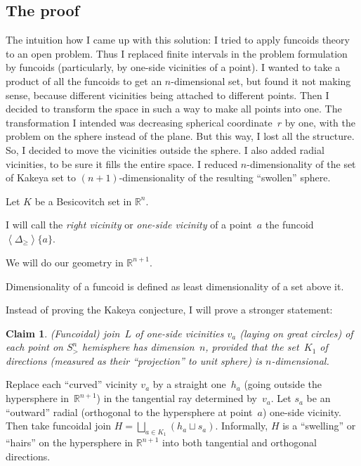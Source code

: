 \documentclass[oneside,draft]{amsart}
\newcommand{\supfun}[1]{\left\langle#1\right\rangle}
\newtheorem{claim}{Claim}
\begin{document}
\subsection{The proof}

The intuition how I came up with this solution: I tried to apply funcoids theory to an open problem. Thus I replaced finite intervals in the problem formulation by funcoids (particularly, by one-si\-de vicinities of a point). I wanted to take a product of all the funcoids to get an $n$-di\-men\-si\-on\-al set, but found it not making sense, because different vicinities being attached to different points. Then I decided to transform the space in such a way to make all points into one. The transformation I intended was decreasing spherical coordinate~$r$ by one, with the problem on the sphere instead of the plane. But this way, I lost all the structure. So, I decided to move the vicinities outside the sphere. I also added radial vicinities, to be sure it fills the entire space. I reduced $n$-di\-men\-sio\-na\-li\-ty of the set of Kakeya set to $(n+1)$-di\-men\-sio\-na\-li\-ty of the resulting ``swollen'' sphere.

Let $K$ be a Besicovitch set in $\mathbb{R}^n$.

I will call the \emph{right vicinity} or \emph{one-si\-de vicinity} of a point~$a$ the funcoid~$\supfun{\Delta_{\geq}}\{a\}$.

We will do our geometry in $\mathbb{R}^{n+1}$.

Dimensionality of a funcoid is defined as least dimensionality of a set above it.

Instead of proving the Kakeya conjecture, I will prove a stronger statement:

\begin{claim}
(Funcoidal) join~$L$ of one-si\-de vicinities $v_a$ (laying on great circles) of each point on $S^n_{>}$ hemisphere has dimension~$n$, provided that the set~$K_1$ of directions (measured as their ``projection'' to unit sphere) is $n$-di\-men\-sio\-nal.
\end{claim}

Replace each ``curved'' vicinity $v_a$ by a straight one~$h_a$ (going outside the hypersphere in~$\mathbb{R}^{n+1}$) in the tangential ray determined by~$v_a$. Let $s_a$ be an ``outward'' radial (orthogonal to the hypersphere at point~$a$) one-si\-de vicinity. Then take funcoidal join $H=\bigsqcup_{a\in K_1}(h_a\sqcup s_a)$. Informally, $H$ is a ``swelling'' or ``hairs'' on the hypersphere in $\mathbb{R}^{n+1}$ into both tangential and orthogonal directions.
\end{document}
